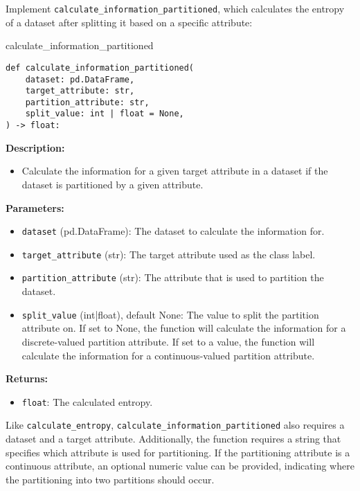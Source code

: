 \documentclass[
english,
smallborders
]{i6prcsht}
\begin{document}
Implement \texttt{calculate\_information\_partitioned}, which calculates the entropy of a dataset after splitting it based on a specific attribute:

\vspace*{0.3cm}

\begin{functionbox}{calculate\_information\_partitioned}
	\begin{lstlisting}[numbers=none]
def calculate_information_partitioned(
    dataset: pd.DataFrame, 
    target_attribute: str,
    partition_attribute: str, 
    split_value: int | float = None,
) -> float:
\end{lstlisting}
	
	\textbf{Description:}
	\begin{itemize}[leftmargin=*,topsep=0pt]
		\item Calculate the information for a given target attribute in a dataset if the dataset is partitioned by a given attribute.
	\end{itemize}
	
	\textbf{Parameters:}
	\begin{itemize}[leftmargin=*,topsep=0pt]
		\item \texttt{dataset} (pd.DataFrame): The dataset to calculate the information for.
		\item \texttt{target\_attribute} (str): The target attribute used as the class label.
		\item \texttt{partition\_attribute} (str): The attribute that is used to partition the dataset.
		\item \texttt{split\_value} (int|float), default None: The value to split the partition attribute on. If set to None, the function will calculate the information for a discrete-valued partition attribute. If set to a value, the function will calculate the information for a continuous-valued partition attribute.
	\end{itemize}
	
	\textbf{Returns:}
	\begin{itemize}[leftmargin=*,topsep=0pt]
		\item \texttt{float}: The calculated entropy.
	\end{itemize}
\end{functionbox}

\vspace*{0.5cm}

Like \texttt{calculate\_entropy}, \texttt{calculate\_information\_partitioned} also requires a dataset and a target attribute. Additionally, the function requires a string that specifies which attribute is used for partitioning. If the partitioning attribute is a continuous attribute, an optional numeric value can be provided, indicating where the partitioning into two partitions should occur.
\end{document}
